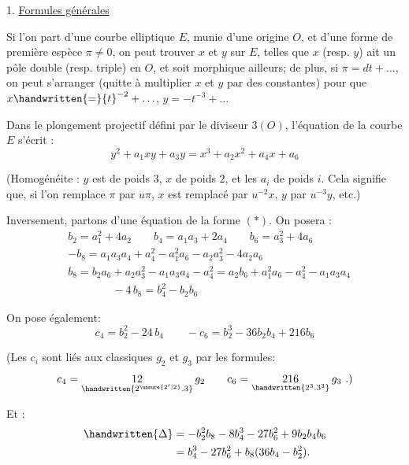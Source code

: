 1. \uline{Formules générales}

Si l'on part d'une courbe elliptique $E$, munie d'une origine $O$, et d'une forme de première espèce $\pi\ne 0$, on peut trouver $x$ et $y$ sur $E$, telles que $x$ (resp. $y$) ait un pôle double (resp. triple) en $O$, et soit morphique ailleurs; de plus, si $\pi=dt+\ldots$, on peut s'arranger (quitte à multiplier $x$ et $y$ par des constantes) pour que $x\handwritten{=}{t}^{-2}+\ldots$, $y=-t^{-3}+\ldots$

Dans le plongement projectif défini par le diviseur $3(O)$, l'équation de la courbe $E$ s'écrit :
{\makeatletter\tagsleft@true\makeatother
\[
 y^{2}+a_{1}xy+a_{3}y=x^{3}+a_{2}x^{2}+a_{4}x+a_{6}
 \tag*{$(\ast)$}
\]
}

(Homogénéite : $y$ est de poids $3$, $x$ de poids $2$, et les $a_{i}$ de poids $i$. Cela signifie que, si l'on remplace $\pi$ par $u\pi$, $x$ est remplacé par $u^{-2}x$, $y$ par $u^{-3}y$, etc.)

Inversement, partons d'une équation de la forme $(\ast)$. On posera :
\[
\begin{aligned}
& b_{2}=a_{1}^{2}+4a_{2} \qquad b_{4}=a_{1}a_{3}+2a_{4} \qquad b_{6}=a_{3}^{2}+4a_{6} \\
& -b_{8}=a_{1}a_{3}a_{4}+a_{4}^{2}-a_{1}^{2}a_{6}-a_{2}a_{3}^{2}-4a_{2}a_{6} \\
& b_{8}=b_{2}a_{6}+a_{2}a_{3}^{2}-a_{1}a_{3}a_{4}-a_{4}^{2}=a_{2}b_{6}+a_{1}^{2}a_{6}-a_{4}^{2}-a_{1}a_{3}a_{4} \\
& \hspace{4em}-4\,b_{8}=b_{4}^{2}-b_{2}b_{6}
\end{aligned}
\]

On pose également:
\[
 c_{4}=b_{2}^{2}-24\,b_{4}\qquad -c_{6}=b_{2}^{3}-36b_{2}b_{4}+216b_{6}
\]

(Les $c_{i}$ sont liés aux classiques $g_{2}$ et $g_{3}$ par les formules:
\[
 c_{4}=\underset{\handwritten{2^{\unsure{2'|2}}\mathord{.}3}}{12}\,g_{2}
 \qquad c_{6}=\underset{\handwritten{2^{3}\mathord{.}3^{3}}}{216}\,g_{3}\ .)
\]

Et :
\[
\begin{aligned}
\handwritten{\Delta}&=-b_{2}^{2}b_{8}-8b_{4}^{3}-27b_{6}^{2}+9b_{2}b_{4}b_{6}\\
&=b_{4}^{3}-27b_{6}^{2}+b_{8}(36b_{4}-b_{2}^{2}).
\end{aligned}
\]

